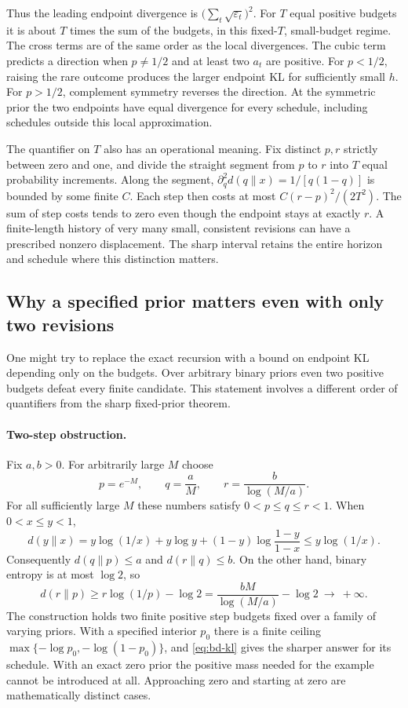 \documentclass[12pt,letterpaper]{article}
\begin{document}
Thus the leading endpoint divergence is $\bigl(\sum_t\sqrt{\varepsilon_t}\bigr)^2$. For $T$ equal positive budgets it is about $T$ times the sum of the budgets, in this fixed-$T$, small-budget regime. The cross terms are of the same order as the local divergences. The cubic term predicts a direction when $p\ne1/2$ and at least two $a_t$ are positive. For $p<1/2$, raising the rare outcome produces the larger endpoint KL for sufficiently small $h$. For $p>1/2$, complement symmetry reverses the direction. At the symmetric prior the two endpoints have equal divergence for every schedule, including schedules outside this local approximation.

The quantifier on $T$ also has an operational meaning. Fix distinct $p,r$ strictly between zero and one, and divide the straight segment from $p$ to $r$ into $T$ equal probability increments. Along the segment, $\partial_q^2d(q\|x)=1/[q(1-q)]$ is bounded by some finite $C$. Each step then costs at most $C(r-p)^2/(2T^2)$. The sum of step costs tends to zero even though the endpoint stays at exactly $r$. A finite-length history of very many small, consistent revisions can have a prescribed nonzero displacement. The sharp interval retains the entire horizon and schedule where this distinction matters.

\subsection{Why a specified prior matters even with only two revisions}

One might try to replace the exact recursion with a bound on endpoint KL depending only on the budgets. Over arbitrary binary priors even two positive budgets defeat every finite candidate. This statement involves a different order of quantifiers from the sharp fixed-prior theorem.

\paragraph{Two-step obstruction.}
Fix $a,b>0$. For arbitrarily large $M$ choose
\[
 p=e^{-M},\qquad q=\frac{a}{M},\qquad r=\frac{b}{\log(M/a)}.
\]
For all sufficiently large $M$ these numbers satisfy $0<p\leq q\leq r<1$. When $0<x\leq y<1$,
\[
 d(y\|x)
 =y\log(1/x)+y\log y +(1-y)\log\frac{1-y}{1-x}
 \leq y\log(1/x).
\]
Consequently $d(q\|p)\leq a$ and $d(r\|q)\leq b$. On the other hand, binary entropy is at most $\log 2$, so
\[
 d(r\|p)\geq r\log(1/p)-\log 2
   =\frac{bM}{\log(M/a)}-\log 2\ \longrightarrow\ +\infty .
\]
The construction holds two finite positive step budgets fixed over a family of varying priors. With a specified interior $p_0$ there is a finite ceiling $\max\{-\log p_0,-\log(1-p_0)\}$, and \eqref{eq:bd-kl} gives the sharper answer for its schedule. With an exact zero prior the positive mass needed for the example cannot be introduced at all. Approaching zero and starting at zero are mathematically distinct cases.
\end{document}
